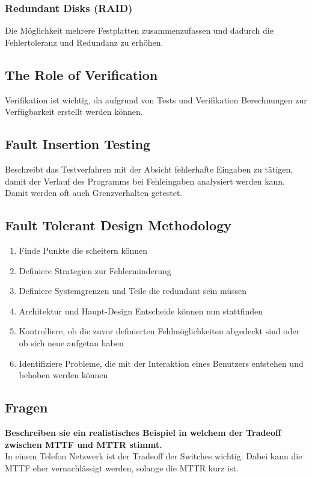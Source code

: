 \subsubsection*{Redundant Disks (RAID)}

Die Möglichkeit mehrere Festplatten zusammenzufassen und dadurch die Fehlertoleranz und Redundanz zu erhöhen.

\subsection{The Role of Verification}

Verifikation ist wichtig, da aufgrund von Tests und Verifikation Berechnungen zur Verfügbarkeit erstellt werden können.

\subsection{Fault Insertion Testing}

Beschreibt das Testverfahren mit der Absicht fehlerhafte Eingaben zu tätigen, damit der Verlauf des Programms bei Fehleingaben analysiert werden kann. Damit werden oft auch Grenzverhalten getestet.

\subsection{Fault Tolerant Design Methodology}

\begin{enumerate}
	\item Finde Punkte die scheitern können
	\item Definiere Strategien zur Fehlerminderung
	\item Definiere Systemgrenzen und Teile die redundant sein müssen
	\item Architektur und Haupt-Design Entscheide können nun stattfinden
	\item Kontrolliere, ob die zuvor definierten Fehlmöglichkeiten abgedeckt sind oder ob sich neue aufgetan haben
	\item Identifiziere Probleme, die mit der Interaktion eines Benutzers entstehen und behoben werden können
\end{enumerate}

 \subsection{Fragen}
 \textbf{Beschreiben sie ein realistisches Beispiel in welchem der Tradeoff zwischen \gls{MTTF} und \gls{MTTR} stimmt.}\\
In einem Telefon Netzwerk ist der Tradeoff der Switches wichtig. Dabei kann die \gls{MTTF} eher vernachlässigt werden, solange die \gls{MTTR} kurz ist. \\

